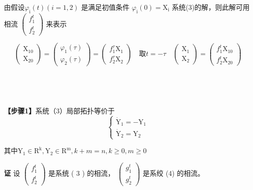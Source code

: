 \documentclass[12pt,a4paper,UTF8]{ctexart}
\begin{document}
由假设${\varphi}_{\mathrm{i}}(t)(i=1,2)$ 是满足初值条件 $\varphi_{\mathrm{i}}(0)=\mathrm{X}_{\mathrm{i}}$ 系统(3)的解，则此解可用相流 $\left(\begin{array}{l}f_1^t \\ f_2^t\end{array}\right)$ 来表示

$$\left(\begin{array}{l}\mathrm{X}_{10} \\ \mathrm{X}_{20}\end{array}\right)=\left(\begin{array}{l}\varphi_1(\tau) \\ \varphi_2(\tau)\end{array}\right)=\left(\begin{array}{l}f_1^{\tau} \mathrm{X}_1 \\ f_2^{\tau} \mathrm{X}_2\end{array}\right) \quad\text{取} t=-\tau \quad\left(\begin{array}{l}\mathrm{X}_1 \\ \mathrm{X}_2\end{array}\right)=\left(\begin{array}{l}f_1^{t} \mathrm{X}_{10} \\ f_2^t \mathrm{X}_{20}\end{array}\right)$$





\begin{spacing}{1.0}
	~
\end{spacing}
\begin{spacing}{0.8}
		~
\end{spacing}

\textbf{【步骤1】}系统（3）局部拓扑等价于
\begin{equation}
	\left\{\begin{array}{l}\dot{\mathrm{Y}}_1=-\mathrm{Y}_1 \\ \dot{\mathrm{Y}}_2=\mathrm{Y}_2\end{array}\right.
\end{equation}

其中$\mathrm{Y}_1 \in \mathrm{R}^{\mathrm{k}}, \mathrm{Y}_2 \in \mathrm{R}^{\mathrm{m}}, k+m=n, k \geq 0, m \geq 0$

\textbf{证 }设 $\left(\begin{array}{l}f_1^t \\ f_2^{t}\end{array}\right)$ 是系统 ( 3 ) 的相流， $\left(\begin{array}{l}g_1^t \\ g_2^{t}\end{array}\right)$ 是系绞 (4) 的相流。 
\end{document}
